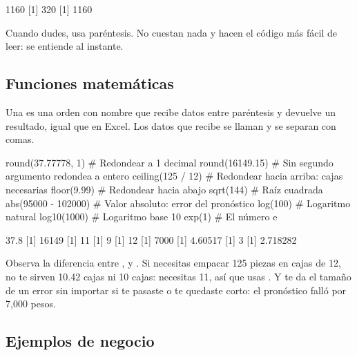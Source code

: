 \begin{rsalida}
[1] 1160
[1] 320
[1] 1160
\end{rsalida}

\begin{consejo}
Cuando dudes, usa paréntesis. No cuestan nada y hacen el código más fácil de
leer:  se entiende al instante.
\end{consejo}

\subsection{Funciones matemáticas}

Una  es una orden con nombre que recibe datos entre
paréntesis y devuelve un resultado, igual que  en
Excel. Los datos que recibe se llaman  y se separan con
comas.

\begin{rcode}
round(37.77778, 1)     # Redondear a 1 decimal
round(16149.15)        # Sin segundo argumento redondea a entero
ceiling(125 / 12)      # Redondear hacia arriba: cajas necesarias
floor(9.99)            # Redondear hacia abajo
sqrt(144)              # Raíz cuadrada
abs(95000 - 102000)    # Valor absoluto: error del pronóstico
log(100)               # Logaritmo natural
log10(1000)            # Logaritmo base 10
exp(1)                 # El número e
\end{rcode}
\begin{rsalida}
[1] 37.8
[1] 16149
[1] 11
[1] 9
[1] 12
[1] 7000
[1] 4.60517
[1] 3
[1] 2.718282
\end{rsalida}

Observa la diferencia entre ,  y
. Si necesitas empacar 125 piezas en cajas de 12, no te
sirven 10.42 cajas ni 10 cajas: necesitas 11, así que usas
. Y  te da el tamaño de un error sin
importar si te pasaste o te quedaste corto: el pronóstico falló por 7,000
pesos.

\subsection{Ejemplos de negocio}

